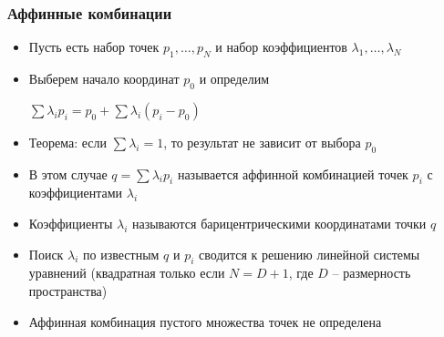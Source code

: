 \documentclass[10pt]{beamer}
\begin{document}
\begin{frame}[fragile]
\frametitle{Аффинные комбинации}
\begin{itemize}
\item Пусть есть набор точек \begin{math}p_1, \dots, p_N\end{math} и набор коэффициентов \begin{math}\lambda_1, \dots, \lambda_N\end{math}
\pause
\item Выберем начало координат \begin{math}p_0\end{math} и определим

\begin{math}\sum \lambda_i p_i = p_0 + \sum \lambda_i (p_i - p_0) \end{math}
\pause
\item Теорема: если \begin{math}\sum \lambda_i = 1\end{math}, то результат не зависит от выбора \begin{math}p_0\end{math}
\pause
\item В этом случае \begin{math}q = \sum \lambda_i p_i\end{math} называется аффинной комбинацией точек \begin{math}p_i\end{math} с коэффициентами \begin{math}\lambda_i\end{math}
\pause
\item Коэффициенты \begin{math}\lambda_i\end{math} называются барицентрическими координатами точки \begin{math}q\end{math}
\pause
\item Поиск \begin{math}\lambda_i\end{math} по известным \begin{math}q\end{math} и \begin{math}p_i\end{math} сводится к решению линейной системы уравнений (квадратная только если \begin{math}N = D + 1\end{math}, где \begin{math}D\end{math} -- размерность пространства)
\pause
\item Аффинная комбинация пустого множества точек не определена
\end{itemize}
\end{frame}
\end{document}
